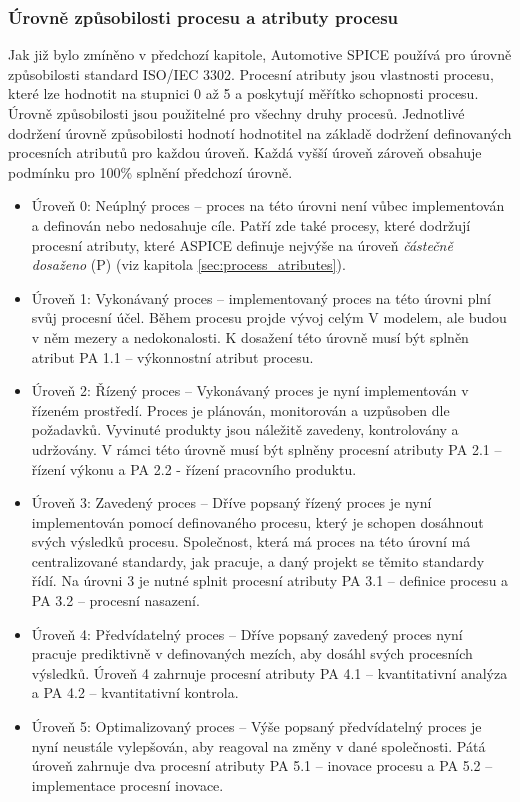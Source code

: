 \documentclass[czech,master,public,dept460,male,cpdeclaration,oneside]{diploma}
\begin{document}
\subsubsection{Úrovně způsobilosti procesu a atributy procesu}
Jak již bylo zmíněno v předchozí kapitole, Automotive SPICE používá pro úrovně způsobilosti standard ISO/IEC 3302. Procesní atributy jsou vlastnosti procesu, které lze hodnotit na stupnici 0 až 5 a poskytují měřítko schopnosti procesu. Úrovně způsobilosti jsou použitelné pro všechny druhy procesů. Jednotlivé dodržení úrovně způsobilosti hodnotí hodnotitel na základě dodržení definovaných procesních atributů pro každou úroveň. Každá vyšší úroveň zároveň obsahuje podmínku pro 100\% splnění předchozí úrovně.

\begin{itemize}
\item Úroveň 0: Neúplný proces -- proces na této úrovni není vůbec implementován a definován nebo nedosahuje cíle. Patří zde také procesy, které dodržují procesní atributy, které ASPICE definuje nejvýše na úroveň \textit{částečně dosaženo} (P) (viz kapitola \ref{sec:process_atributes}).

\item Úroveň 1: Vykonávaný proces -- implementovaný proces na této úrovni plní svůj procesní účel. Během procesu projde vývoj celým V modelem, ale budou v něm mezery a nedokonalosti. K dosažení této úrovně musí být splněn atribut PA 1.1 -- výkonnostní atribut procesu.

\item Úroveň 2: Řízený proces -- Vykonávaný proces je nyní implementován v řízeném prostředí. Proces je plánován, monitorován a uzpůsoben dle požadavků. Vyvinuté produkty jsou náležitě zavedeny, kontrolovány a udržovány. V rámci této úrovně musí být splněny procesní atributy PA 2.1 -- řízení výkonu a PA 2.2 - řízení pracovního produktu.

\item Úroveň 3: Zavedený proces -- Dříve popsaný řízený proces je nyní implementován pomocí definovaného procesu, který je schopen dosáhnout svých výsledků procesu. Společnost, která má proces na této úrovní má centralizované standardy, jak pracuje, a daný projekt se těmito standardy řídí. Na úrovni 3 je nutné splnit procesní atributy PA 3.1 -- definice procesu a
PA 3.2 -- procesní nasazení.

\item Úroveň 4: Předvídatelný proces -- Dříve popsaný zavedený proces nyní pracuje prediktivně v definovaných mezích, aby dosáhl svých procesních výsledků. Úroveň 4 zahrnuje procesní atributy PA 4.1 -- kvantitativní analýza a PA 4.2 -- kvantitativní kontrola.

\item Úroveň 5: Optimalizovaný proces -- Výše popsaný předvídatelný proces je nyní neustále vylepšován, aby reagoval na změny v dané společnosti. Pátá úroveň zahrnuje dva procesní atributy PA 5.1 -- inovace procesu a PA 5.2 -- implementace procesní inovace.

\end{itemize}
\end{document}
